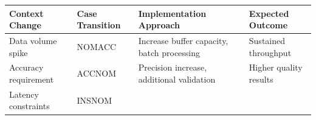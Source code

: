 \documentclass[
  11pt,
  letterpaper,
]{article}
\begin{document}
\begin{longtable}[]{@{}llll@{}}
\toprule
\begin{minipage}[b]{0.19\columnwidth}\raggedright
Context Change\strut
\end{minipage} & \begin{minipage}[b]{0.19\columnwidth}\raggedright
Case Transition\strut
\end{minipage} & \begin{minipage}[b]{0.30\columnwidth}\raggedright
Implementation Approach\strut
\end{minipage} & \begin{minipage}[b]{0.21\columnwidth}\raggedright
Expected Outcome\strut
\end{minipage}\tabularnewline
\midrule
\endhead
\begin{minipage}[t]{0.19\columnwidth}\raggedright
Data volume spike\strut
\end{minipage} & \begin{minipage}[t]{0.19\columnwidth}\raggedright
NOMACC\strut
\end{minipage} & \begin{minipage}[t]{0.30\columnwidth}\raggedright
Increase buffer capacity, batch processing\strut
\end{minipage} & \begin{minipage}[t]{0.21\columnwidth}\raggedright
Sustained throughput\strut
\end{minipage}\tabularnewline
\begin{minipage}[t]{0.19\columnwidth}\raggedright
Accuracy requirement\strut
\end{minipage} & \begin{minipage}[t]{0.19\columnwidth}\raggedright
ACCNOM\strut
\end{minipage} & \begin{minipage}[t]{0.30\columnwidth}\raggedright
Precision increase, additional validation\strut
\end{minipage} & \begin{minipage}[t]{0.21\columnwidth}\raggedright
Higher quality results\strut
\end{minipage}\tabularnewline
\begin{minipage}[t]{0.19\columnwidth}\raggedright
Latency constraints\strut
\end{minipage} & \begin{minipage}[t]{0.19\columnwidth}\raggedright
INSNOM\strut
\end{minipage} & \begin{minipage}[t]{0.30\columnwidth}\raggedright

\end{minipage}
\end{longtable}
\end{document}
